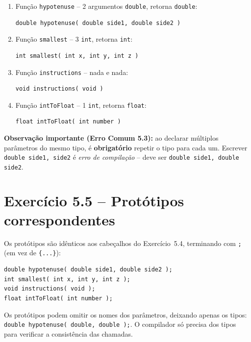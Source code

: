 \documentclass[12pt,a4paper]{article}
\begin{document}
\begin{respostabox}
\begin{enumerate}[label=\textbf{\alph*)}]
\item Função \texttt{hypotenuse} -- 2 argumentos \texttt{double}, retorna \texttt{double}:
\begin{lstlisting}
double hypotenuse( double side1, double side2 )
\end{lstlisting}

\item Função \texttt{smallest} -- 3 \texttt{int}, retorna \texttt{int}:
\begin{lstlisting}
int smallest( int x, int y, int z )
\end{lstlisting}

\item Função \texttt{instructions} -- nada e nada:
\begin{lstlisting}
void instructions( void )
\end{lstlisting}

\item Função \texttt{intToFloat} -- 1 \texttt{int}, retorna \texttt{float}:
\begin{lstlisting}
float intToFloat( int number )
\end{lstlisting}
\end{enumerate}

\textbf{Observação importante (Erro Comum 5.3):} ao declarar múltiplos parâmetros
do mesmo tipo, é \textbf{obrigatório} repetir o tipo para cada um. Escrever
\texttt{double side1, side2} é \textit{erro de compilação} -- deve ser
\texttt{double side1, double side2}.
\end{respostabox}

\section{Exercício 5.5 -- Protótipos correspondentes}

\begin{respostabox}
Os protótipos são idênticos aos cabeçalhos do Exercício~5.4, terminando com
\texttt{;} (em vez de \texttt{\{...\}}):
\begin{lstlisting}
double hypotenuse( double side1, double side2 );
int smallest( int x, int y, int z );
void instructions( void );
float intToFloat( int number );
\end{lstlisting}

\begin{boaprática}
  Os protótipos podem omitir os nomes dos parâmetros, deixando apenas os tipos:
  \texttt{double hypotenuse( double, double );}. O compilador só precisa dos tipos
  para verificar a consistência das chamadas.
\end{boaprática}
\end{respostabox}
\end{document}
